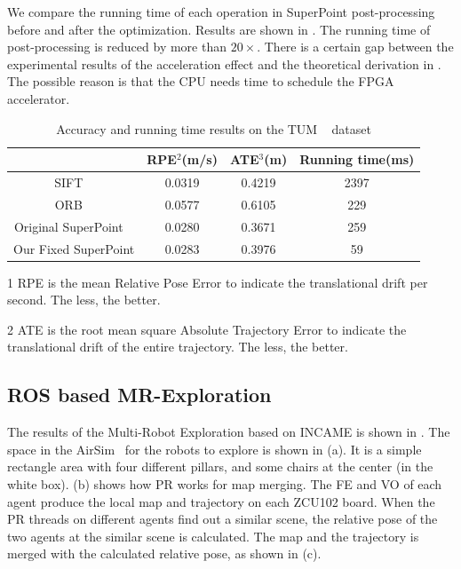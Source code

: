 We compare the running time of each operation in SuperPoint post-processing before and after the optimization. Results are shown in . The running time of post-processing is reduced by more than $20\times$. There is a certain gap between the experimental results of the acceleration effect and the theoretical derivation in . The possible reason is that the CPU needs time to schedule the FPGA accelerator.

\begin{table}[t]
  \centering
  \setlength{\abovecaptionskip}{2pt} 
  \caption{ Accuracy and running time results on the TUM ~\cite{sturm12iros} dataset  }
  \footnotesize
  \begin{threeparttable}
\begin{tabular}{|c|c|c|c|} 
  \hline
        & RPE$^2$(m/s) & ATE$^3$(m)  & Running time(ms) \bigstrut\\
  \hline
  SIFT  ~\cite{Lowe-478}  & 0.0319  & 0.4219 & 2397  \bigstrut\\
  \hline
  ORB  ~\cite{Mur-Artal:2017281}  & 0.0577  & 0.6105 & 229  \bigstrut\\
  \hline
  Original SuperPoint  ~\cite{detone2018superpoint} & 0.0280  & 0.3671 & 259  \bigstrut\\
  \hline
  Our Fixed SuperPoint  & 0.0283  & 0.3976 & 59  \bigstrut\\
  \hline
  \end{tabular}%
  

\begin{tablenotes}
  \item[1] RPE is the mean Relative Pose Error to indicate the translational drift per second. The less, the better.
  \item[2] ATE is the root mean square Absolute Trajectory Error to indicate the translational drift of the entire trajectory. The less, the better.
\end{tablenotes}
    \end{threeparttable}
  \label{tab:VO}%
\end{table}%

\subsection{ ROS based MR-Exploration }

The results of the Multi-Robot Exploration based on INCAME is shown in . The space in the AirSim~\cite{shah2018airsim} for the robots to explore is shown in (a). It is a simple rectangle area with four different pillars, and some chairs at the center (in the white box).  (b) shows how PR works for map merging. The FE and VO of each agent produce the local map and trajectory on each ZCU102 board. When the PR threads on different agents find out a similar scene, the relative pose of the two agents at the similar scene is calculated. The map and the trajectory is merged with the calculated relative pose, as shown in (c).

